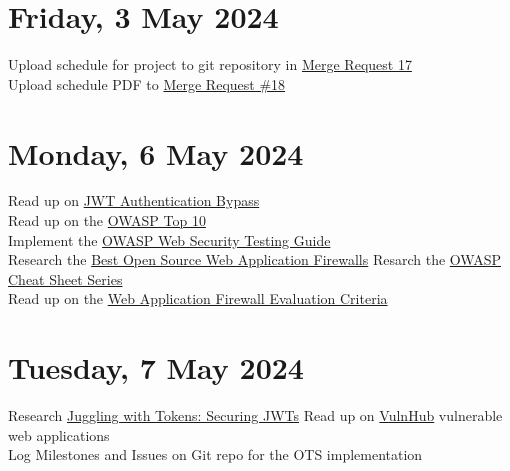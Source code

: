 \section[2024/05/03]{Friday, 3 May 2024}
Upload schedule for project to git repository in \href{https://repo.ee.up.ac.za/eece_ugfyp_tg/2024_isg/tg4-koot-u20426471/-/merge_requests/17}{Merge Request 17}\\
Upload schedule PDF to \href{https://repo.ee.up.ac.za/eece_ugfyp_tg/2024_isg/tg4-koot-u20426471/-/merge_requests/18}{Merge Request \#18}\\
\pendsign

\section[2024/05/06]{Monday, 6 May 2024}
Read up on \href{https://redfoxsec.com/blog/jwt-authentication-bypass/}{JWT Authentication Bypass}\\
Read up on the \href{https://owasp.org/Top10/}{OWASP Top 10}\\
Implement the \href{https://owasp.org/www-project-web-security-testing-guide/}{OWASP Web Security Testing Guide}\\
Research the \href{https://www.zenarmor.com/docs/network-security-tutorials/best-open-source-web-application-firewalls}{Best Open Source Web Application Firewalls}
Resarch the \href{https://github.com/OWASP/CheatSheetSeries}{OWASP Cheat Sheet Series}\\
Read up on the \href{http://projects.webappsec.org/w/page/13246985/Web%20Application%20Firewall%20Evaluation%20Criteria}{Web Application Firewall Evaluation Criteria}\\
\pendsign

\section[2024/05/07]{Tuesday, 7 May 2024}
Research \href{https://www.mwrcybersec.com/research\_items/juggling-with-tokens-securing-jwts}{Juggling with Tokens: Securing JWTs}
Read up on \href{https://www.vulnhub.com/}{VulnHub} vulnerable web applications\\
Log Milestones and Issues on Git repo for the OTS implementation\\
\pendsign

